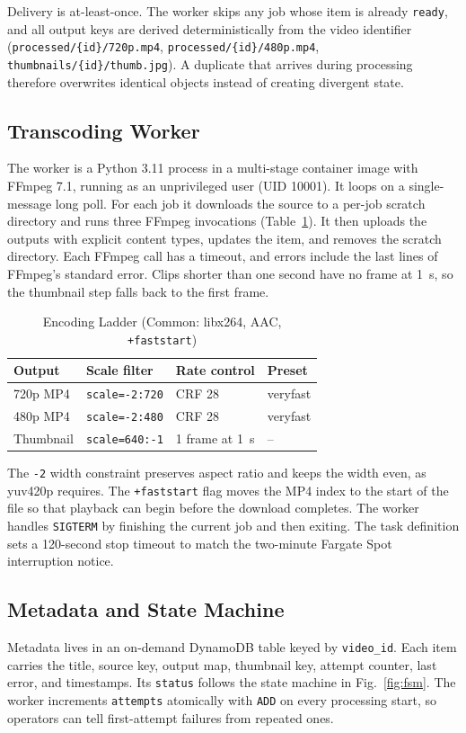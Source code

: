 \documentclass[conference]{IEEEtran}
\begin{document}
Delivery is at-least-once. The worker skips any job whose item is already \texttt{ready}, and all output keys are derived deterministically from the video identifier (\texttt{processed/\{id\}/720p.mp4}, \texttt{processed/\{id\}/480p.mp4}, \texttt{thumbnails/\{id\}/thumb.jpg}). A duplicate that arrives during processing therefore overwrites identical objects instead of creating divergent state.

\subsection{Transcoding Worker}
The worker is a Python 3.11 process in a multi-stage container image with FFmpeg 7.1, running as an unprivileged user (UID 10001). It loops on a single-message long poll. For each job it downloads the source to a per-job scratch directory and runs three FFmpeg invocations (Table~\ref{tab:ladder}). It then uploads the outputs with explicit content types, updates the item, and removes the scratch directory. Each FFmpeg call has a timeout, and errors include the last lines of FFmpeg's standard error. Clips shorter than one second have no frame at 1~s, so the thumbnail step falls back to the first frame.

\begin{table}[t]
\caption{Encoding Ladder (Common: libx264, AAC, \texttt{+faststart})}
\label{tab:ladder}
\centering
\begin{tabular}{@{}llll@{}}
\toprule
Output & Scale filter & Rate control & Preset \\
\midrule
720p MP4 & \texttt{scale=-2:720} & CRF 28 & veryfast \\
480p MP4 & \texttt{scale=-2:480} & CRF 28 & veryfast \\
Thumbnail & \texttt{scale=640:-1} & 1 frame at 1~s & -- \\
\bottomrule
\end{tabular}
\end{table}

The \texttt{-2} width constraint preserves aspect ratio and keeps the width even, as yuv420p requires. The \texttt{+faststart} flag moves the MP4 index to the start of the file so that playback can begin before the download completes. The worker handles \texttt{SIGTERM} by finishing the current job and then exiting. The task definition sets a 120-second stop timeout to match the two-minute Fargate Spot interruption notice.

\subsection{Metadata and State Machine}
Metadata lives in an on-demand DynamoDB table keyed by \texttt{video\_id}. Each item carries the title, source key, output map, thumbnail key, attempt counter, last error, and timestamps. Its \texttt{status} follows the state machine in Fig.~\ref{fig:fsm}. The worker increments \texttt{attempts} atomically with \texttt{ADD} on every processing start, so operators can tell first-attempt failures from repeated ones.
\end{document}

